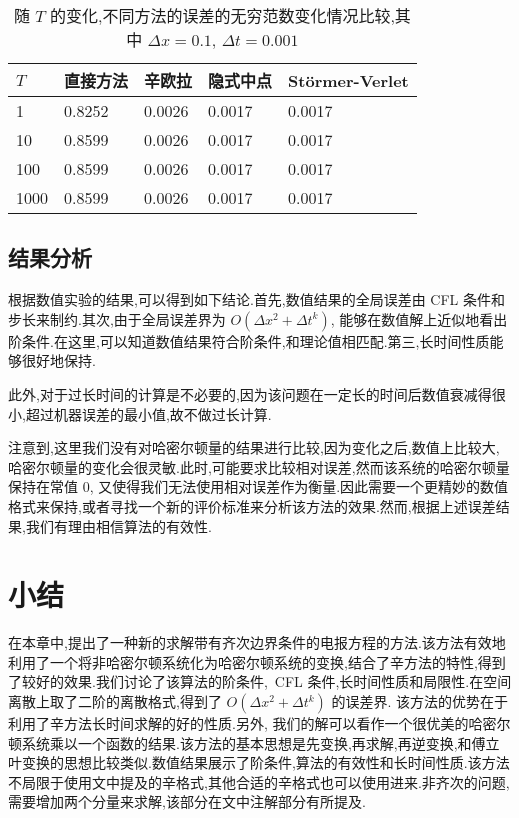 \begin{table}[h]
  \centering
\caption{随 $T$ 的变化,不同方法的误差的无穷范数变化情况比较,其中 $\Delta x=0.1$, $\Delta t=0.001$}
\begin{tabularx}{\linewidth}{XXXXX}
 \toprule[1.5pt]
 $T$ &直接方法 & 辛欧拉 & 隐式中点 & St\"{o}rmer-Verlet\\
 \midrule[1pt]
 1 & 0.8252 & 0.0026 & 0.0017 & 0.0017 \\
 10 & 0.8599 & 0.0026 & 0.0017 & 0.0017 \\
 100 & 0.8599 & 0.0026 & 0.0017 & 0.0017 \\
 1000 & 0.8599 & 0.0026 & 0.0017 & 0.0017 \\
 \bottomrule[1.5pt]
\end{tabularx}
  \label{tab:t3}
\end{table}

\subsection{结果分析}

根据数值实验的结果,可以得到如下结论.首先,数值结果的全局误差由 CFL 条件和步长来制约.其次,由于全局误差界为 $O(\Delta x^2+ \Delta t^k)$, 能够在数值解上近似地看出阶条件.在这里,可以知道数值结果符合阶条件,和理论值相匹配.第三,长时间性质能够很好地保持.

此外,对于过长时间的计算是不必要的,因为该问题在一定长的时间后数值衰减得很小,超过机器误差的最小值,故不做过长计算.

\begin{remark}
{\rm 注意到,这里我们没有对哈密尔顿量的结果进行比较,因为变化之后,数值上比较大,哈密尔顿量的变化会很灵敏.此时,可能要求比较相对误差,然而该系统的哈密尔顿量保持在常值 $0$, 又使得我们无法使用相对误差作为衡量.因此需要一个更精妙的数值格式来保持,或者寻找一个新的评价标准来分析该方法的效果.然而,根据上述误差结果,我们有理由相信算法的有效性.}
\end{remark}

\section{小结}\label{sec:02conclusion}
在本章中,提出了一种新的求解带有齐次边界条件的电报方程的方法.该方法有效地利用了一个将非哈密尔顿系统化为哈密尔顿系统的变换,结合了辛方法的特性,得到了较好的效果.我们讨论了该算法的阶条件,~CFL 条件,长时间性质和局限性.在空间离散上取了二阶的离散格式,得到了 $O(\Delta x^2+ \Delta
t^k)$ 的误差界. 该方法的优势在于利用了辛方法长时间求解的好的性质.另外, 我们的解可以看作一个很优美的哈密尔顿系统乘以一个函数的结果.该方法的基本思想是先变换,再求解,再逆变换,和傅立叶变换的思想比较类似.数值结果展示了阶条件,算法的有效性和长时间性质.该方法不局限于使用文中提及的辛格式,其他合适的辛格式也可以使用进来.非齐次的问题,需要增加两个分量来求解,该部分在文中注解部分有所提及.

